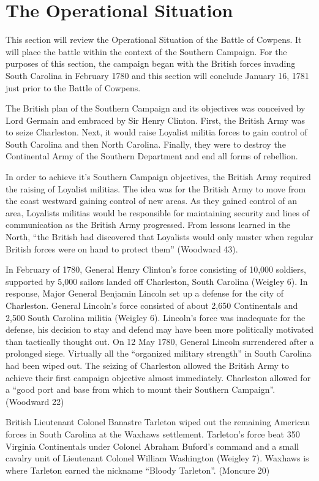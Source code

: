 \section{The Operational Situation}

This section will review the Operational Situation of the Battle of Cowpens.  It will place the battle within the context of the Southern Campaign.   For the purposes of this section, the campaign began with the British forces invading South Carolina in February 1780 and this section will conclude January 16, 1781 just prior to the Battle of Cowpens.

The British plan of the Southern Campaign and its objectives was conceived by Lord Germain and embraced by Sir Henry Clinton.  First, the British Army was to seize Charleston.  Next, it would raise Loyalist militia forces to gain control of South Carolina and then North Carolina.  Finally, they were to destroy the Continental Army of the Southern Department and end all forms of rebellion.

In order to achieve it's Southern Campaign objectives, the British Army required the raising of Loyalist militias.  The idea was for the British Army to move from the coast westward gaining control of new areas.  As they gained control of an area, Loyalists militias would be responsible for maintaining security and lines of communication as the British Army progressed.  From lessons learned in the North, ``the British had discovered that Loyalists would only muster when regular British forces were on hand to protect them'' (Woodward 43).

In February of 1780, General Henry Clinton's force consisting of 10,000 soldiers, supported by 5,000 sailors landed off Charleston, South Carolina (Weigley 6).   In response, Major General Benjamin Lincoln set up a defense for the city of Charleston. General Lincoln's force consisted of about 2,650 Continentals and 2,500 South Carolina militia (Weigley 6).  Lincoln's force was inadequate for the defense, his decision to stay and defend may have been more politically motivated than tactically thought out.  On 12 May 1780, General Lincoln surrendered after a prolonged siege.   Virtually all the ``organized military strength'' in South Carolina had been wiped out.  The seizing of Charleston allowed the British Army to achieve their first campaign objective almost immediately.  Charleston allowed for a ``good port and base from which to mount their Southern Campaign''. (Woodward 22)

British Lieutenant Colonel Banastre Tarleton wiped out the remaining American forces in South Carolina at the Waxhaws settlement.  Tarleton's force beat 350 Virginia Continentals under Colonel Abraham Buford's command and a small cavalry unit of Lieutenant Colonel William Washington (Weigley 7).  Waxhaws is where Tarleton earned the nickname ``Bloody Tarleton''. (Moncure 20)

